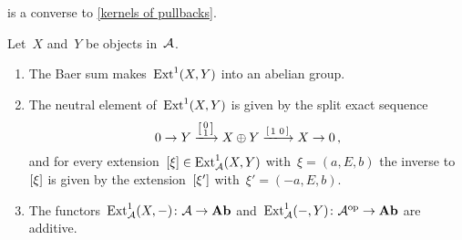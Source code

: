 \begin{remarknonum}
   is a converse to \cref{kernels of pullbacks}.
\end{remarknonum}


\begin{theorem}
  Let~$X$ and~$Y$ be objects in~$\mathcal{A}$.
  \begin{enumerate}
    \item
      The Baer sum makes~$\operatorname{Ext}^1(X,Y)$ into an abelian group.
    \item
      The neutral element of~$\operatorname{Ext}^1(X,Y)$ is given by the split exact sequence
      \[
        0
        \to
        Y
        \xlongto{ \begin{bsmallmatrix} 0 \\ 1 \end{bsmallmatrix} }
        X \oplus Y
        \xlongto{ \begin{bsmallmatrix} 1 & 0 \end{bsmallmatrix} }
        X
        \to
        0 \,,
      \]
      and for every extension~$[\xi] \in \operatorname{Ext}^1_{\mathcal{A}}(X,Y)$ with~$\xi = (a,E,b)$ the inverse to~$[\xi]$ is given by the extension~$[\xi']$ with~$\xi' = (-a,E,b)$.
    \item
      The functors~$\operatorname{Ext}^1_{\mathcal{A}}(X,-) \colon \mathcal{A} \to \mathbf{Ab}$ and~$\operatorname{Ext}^1_{\mathcal{A}}(-,Y) \colon \mathcal{A}^{\mathrm{op}} \to \mathbf{Ab}$ are additive.
  \end{enumerate}
\end{theorem}









